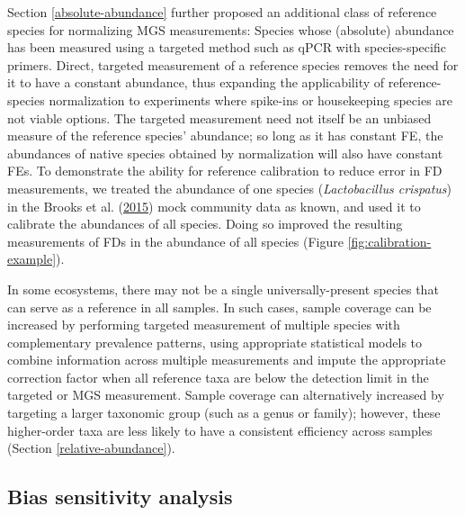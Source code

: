 \documentclass[
]{article}
\begin{document}
Section \ref{absolute-abundance} further proposed an additional class of reference species for normalizing MGS measurements: Species whose (absolute) abundance has been measured using a targeted method such as qPCR with species-specific primers.
Direct, targeted measurement of a reference species removes the need for it to have a constant abundance, thus expanding the applicability of reference-species normalization to experiments where spike-ins or housekeeping species are not viable options.
The targeted measurement need not itself be an unbiased measure of the reference species' abundance; so long as it has constant FE, the abundances of native species obtained by normalization will also have constant FEs.
To demonstrate the ability for reference calibration to reduce error in FD measurements, we treated the abundance of one species (\emph{Lactobacillus crispatus}) in the Brooks et al. (\protect\hyperlink{ref-brooks2015thet}{2015}) mock community data as known, and used it to calibrate the abundances of all species.
Doing so improved the resulting measurements of FDs in the abundance of all species (Figure \ref{fig:calibration-example}).

In some ecosystems, there may not be a single universally-present species that can serve as a reference in all samples.
In such cases, sample coverage can be increased by performing targeted measurement of multiple species with complementary prevalence patterns, using appropriate statistical models to combine information across multiple measurements and impute the appropriate correction factor when all reference taxa are below the detection limit in the targeted or MGS measurement.
Sample coverage can alternatively increased by targeting a larger taxonomic group (such as a genus or family); however, these higher-order taxa are less likely to have a consistent efficiency across samples (Section \ref{relative-abundance}).

\hypertarget{bias-sensitivity-analysis}{%
\subsection{Bias sensitivity analysis}\label{bias-sensitivity-analysis}}
\end{document}
